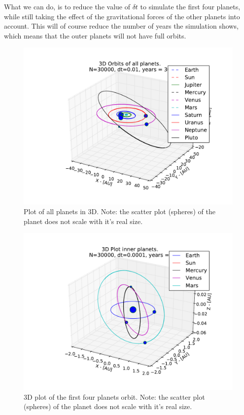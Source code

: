 \documentclass[12pt]{article}
\begin{document}
What we can do, is to reduce the value of $\delta t$ to simulate the first four planets, while still taking the effect of the gravitational forces of the other planets into account. This will of course reduce the number of years the simulation shows, which means that the outer planets will not have full orbits.

\begin{figure}[hbtp]
\centering
\includegraphics[width=\linewidth]{Plots/All_planets_3D_plot.pdf}
\caption{Plot of all planets in 3D. Note: the scatter plot (spheres) of the planet does not scale with it's real size.}
\end{figure}
\begin{figure}[hbtp]
\centering
\includegraphics[width=\linewidth]{Plots/First_planets_3D_plot.pdf}
\caption{3D plot of the first four planets orbit. Note: the scatter plot (spheres) of the planet does not scale with it's real size.}
\end{figure}
\end{document}
